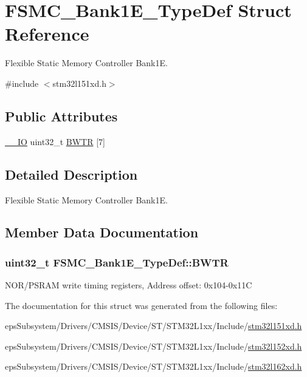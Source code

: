 \hypertarget{struct_f_s_m_c___bank1_e___type_def}{\section{F\-S\-M\-C\-\_\-\-Bank1\-E\-\_\-\-Type\-Def Struct Reference}
\label{struct_f_s_m_c___bank1_e___type_def}
}


Flexible Static Memory Controller Bank1\-E.  




{\ttfamily \#include $<$stm32l151xd.\-h$>$}

\subsection*{Public Attributes}
\begin{DoxyCompactItemize}
\item 
\hyperlink{core__sc300_8h_aec43007d9998a0a0e01faede4133d6be}{\-\_\-\-\_\-\-I\-O} uint32\-\_\-t \hyperlink{struct_f_s_m_c___bank1_e___type_def_af48b21e4fa1f975f235bbb3a66a3d38e}{B\-W\-T\-R} \mbox{[}7\mbox{]}
\end{DoxyCompactItemize}


\subsection{Detailed Description}
Flexible Static Memory Controller Bank1\-E. 

\subsection{Member Data Documentation}
\hypertarget{struct_f_s_m_c___bank1_e___type_def_af48b21e4fa1f975f235bbb3a66a3d38e}{
\subsubsection[{B\-W\-T\-R}]{ uint32\-\_\-t F\-S\-M\-C\-\_\-\-Bank1\-E\-\_\-\-Type\-Def\-::\-B\-W\-T\-R}}\label{struct_f_s_m_c___bank1_e___type_def_af48b21e4fa1f975f235bbb3a66a3d38e}
N\-O\-R/\-P\-S\-R\-A\-M write timing registers, Address offset\-: 0x104-\/0x11\-C 

The documentation for this struct was generated from the following files\-:\begin{DoxyCompactItemize}
\item 
eps\-Subsystem/\-Drivers/\-C\-M\-S\-I\-S/\-Device/\-S\-T/\-S\-T\-M32\-L1xx/\-Include/\hyperlink{stm32l151xd_8h}{stm32l151xd.\-h}\item 
eps\-Subsystem/\-Drivers/\-C\-M\-S\-I\-S/\-Device/\-S\-T/\-S\-T\-M32\-L1xx/\-Include/\hyperlink{stm32l152xd_8h}{stm32l152xd.\-h}\item 
eps\-Subsystem/\-Drivers/\-C\-M\-S\-I\-S/\-Device/\-S\-T/\-S\-T\-M32\-L1xx/\-Include/\hyperlink{stm32l162xd_8h}{stm32l162xd.\-h}\end{DoxyCompactItemize}
